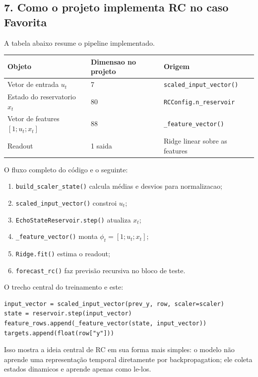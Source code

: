 \documentclass[12pt]{article}
\providecommand{\tightlist}{%
          \setlength{\itemsep}{0pt}\setlength{\parskip}{0pt}}
\begin{document}
\subsection{7. Como o projeto implementa RC no caso Favorita}\label{7-como-o-projeto-implementa-rc-no-caso-favorita}

A tabela abaixo resume o pipeline implementado.

\begin{longtable}[]{@{}lll@{}}
\toprule\noalign{}
Objeto & Dimensao no projeto & Origem \\
\midrule\noalign{}
\endhead
\bottomrule\noalign{}
\endlastfoot
Vetor de entrada \(u_t\) & 7 & \texttt{scaled\_input\_vector()} \\
Estado do reservatorio \(x_t\) & 80 & \texttt{RCConfig.n\_reservoir} \\
Vetor de features \([1; u_t; x_t]\) & 88 & \texttt{\_feature\_vector()} \\
Readout & 1 saida & Ridge linear sobre as features \\
\end{longtable}

O fluxo completo do código e o seguinte:

\begin{enumerate}
\def\labelenumi{\arabic{enumi}.}
\tightlist
\item
  \texttt{build\_scaler\_state()} calcula médias e desvios para normalizacao;
\item
  \texttt{scaled\_input\_vector()} constroi \(u_t\);
\item
  \texttt{EchoStateReservoir.step()} atualiza \(x_t\);
\item
  \texttt{\_feature\_vector()} monta \(\phi_t = [1; u_t; x_t]\);
\item
  \texttt{Ridge.fit()} estima o readout;
\item
  \texttt{forecast\_rc()} faz previsão recursiva no bloco de teste.
\end{enumerate}

O trecho central do treinamento e este:

\begin{verbatim}
input_vector = scaled_input_vector(prev_y, row, scaler=scaler)
state = reservoir.step(input_vector)
feature_rows.append(_feature_vector(state, input_vector))
targets.append(float(row["y"]))
\end{verbatim}

Isso mostra a ideia central de RC em sua forma mais simples: o modelo não aprende uma representação temporal diretamente por backpropagation; ele coleta estados dinamicos e aprende apenas como le-los.
\end{document}
